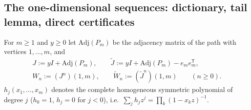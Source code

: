 \documentclass[11pt,a4paper]{article}
\theoremstyle{definition}
\newcommand{\T}{^{\mathsf T}}
\begin{document}
\subsection{The one-dimensional sequences: dictionary, tail lemma, direct certificates}\label{sec:onedim}

For $m\ge1$ and $y\ge0$ let $\mathrm{Adj}(P_m)$ be the adjacency matrix of the path with vertices $1,\dots,m$, and
\begin{gather*}
J:=yI+\mathrm{Adj}(P_m),\qquad\tilde J:=yI+\mathrm{Adj}(P_m)-e_me_m\T,\\
W_n:=(J^n)(1,m),\qquad\tilde W_n:=(\tilde J^n)(1,m)\qquad(n\ge0).
\end{gather*}
$h_j(x_1,\dots,x_m)$ denotes the complete homogeneous symmetric polynomial of degree $j$ ($h_0=1$, $h_j=0$ for $j<0$), i.e.\ $\sum_jh_jz^j=\prod_k(1-x_kz)^{-1}$.
\end{document}
